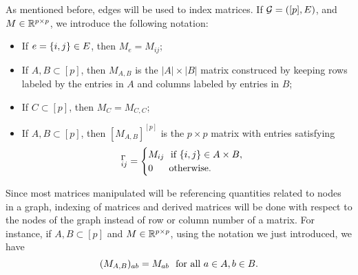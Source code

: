 As mentioned before, edges will be used to index matrices. If ${\mathcal{G}} = ([p], E)$, and $M \in \mathbb{R}^{p \times p}$, we introduce the following notation:
\begin{itemize}
    \item If $e = {\left\{i, j\right\}} \in E$, then $M_e = M_{ij}$;
    \item If $A, B \subset [p]$, then $M_{A, B}$ is the $|A| \times |B|$ matrix construced by keeping rows labeled by the entries in $A$ and columns labeled by entries in $B$;
    \item If $C \subset [p]$, then $M_C = M_{C, C}$;
    \item {
        If $A, B \subset [p]$, then $[M_{A, B}]^{[p]}$ is the $p \times p$ matrix with entries satisfying 
        \begin{equation*}
            [M_{A, B}]^{\Gamma}_{ij} = \begin{cases}
                M_{ij} \ \t{ if } \eset{i, j} \in A \times B, \\
                0 \ \ \ \ \ \t{otherwise}.
            \end{cases}
        \end{equation*}
    }
\end{itemize}
Since most matrices manipulated will be referencing quantities related to nodes in a graph, indexing of matrices and derived matrices will be done with respect to the nodes of the graph instead of row or column number of a matrix. For instance, if $A, B \subset [p]$ and $M \in \mathbb{R}^{p \times p}$, using the notation we just introduced, we have
\begin{equation*}
    (M_{A, B})_{ab} = M_{ab} \ \ {\textrm{for all }} a \in A, b \in B.
\end{equation*}